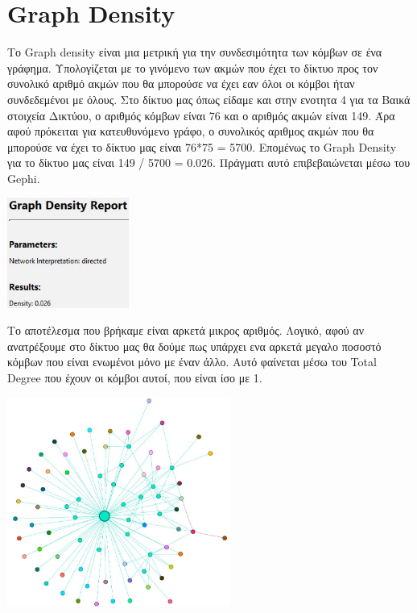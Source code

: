 \documentclass[12pt]{article}
\begin{document}
	
	
	
	\newpage
	\section{Graph Density}
	Το Graph density είναι μια μετρική για την συνδεσιμότητα των κόμβων σε ένα γράφημα. Υπολογίζεται με το γινόμενο των ακμών που έχει το δίκτυο προς τον συνολικό αριθμό ακμών που θα μπορούσε να έχει εαν όλοι οι κόμβοι ήταν συνδεδεμένοι με όλους. Στο δίκτυο μας όπως είδαμε και στην ενοτητα 4 για τα Βαικά στοιχεία Δικτύου, ο αριθμός κόμβων είναι 76 και ο αριθμός ακμών είναι 149. Άρα αφού πρόκειται για κατευθυνόμενο γράφο, ο συνολικός αριθμος ακμών που θα μπορούσε να έχει το δίκτυο μας είναι 76*75 = 5700. Επομένως το Graph Density για το δίκτυο μας είναι 149 / 5700 = 0.026. Πράγματι αυτό επιβεβαιώνεται μέσω του Gephi.
	\begin{center}
		\includegraphics[width=0.3\textwidth]{photos-files/section11/density.JPG}
	\end{center}Το αποτέλεσμα που βρήκαμε είναι αρκετά μικρος αριθμός. Λογικό, αφού αν ανατρέξουμε στο δίκτυο μας θα δούμε πως υπάρχει ενα αρκετά μεγαλο ποσοστό κόμβων που είναι ενωμένοι μόνο με έναν άλλο. Αυτό φαίνεται μέσω του Total Degree που έχουν οι κόμβοι αυτοί, που είναι ίσο με 1.
	\begin{center}
		\includegraphics[width=0.55\textwidth]{photos-files/section11/our_sparse_graph.JPG}
	\end{center}
	
\end{document}
